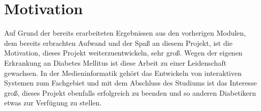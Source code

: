 \documentclass[a4paper, 12pt]{scrartcl}
\begin{document}
			\section{Motivation}
				Auf Grund der bereits erarbeiteten Ergebnissen aus den vorherigen Modulen, dem bereits erbrachten Aufwand und der Spaß an diesem Projekt, ist die Motivation, dieses Projekt weiterzuentwickeln, sehr groß. Wegen der eigenen Erkrankung an Diabetes Mellitus ist diese Arbeit zu einer Leidenschaft gewachsen. In der Medieninformatik gehört das Entwickeln von interaktiven Systemen zum Fachgebiet und mit dem Abschluss des Studiums ist das Interesse groß, dieses Projekt ebenfalls erfolgreich zu beenden und so anderen Diabetikern etwas zur Verfügung zu stellen.

				

			
	
	
\end{document}

